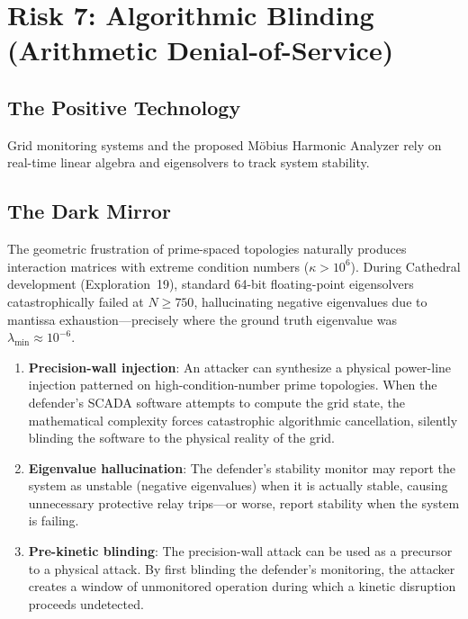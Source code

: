 \documentclass[11pt,a4paper]{article}
\begin{document}
\section{Risk 7: Algorithmic Blinding (Arithmetic Denial-of-Service)}
\label{sec:blinding}

\subsection{The Positive Technology}

Grid monitoring systems and the proposed M\"obius Harmonic Analyzer
rely on real-time linear algebra and eigensolvers to track system
stability.

\subsection{The Dark Mirror}

The geometric frustration of prime-spaced topologies naturally
produces interaction matrices with extreme condition numbers
($\kappa > 10^6$). During Cathedral development (Exploration~19),
standard 64-bit floating-point eigensolvers catastrophically failed
at $N \geq 750$, hallucinating negative eigenvalues due to mantissa
exhaustion---precisely where the ground truth eigenvalue was
$\lambda_{\min} \approx 10^{-6}$.

\begin{enumerate}
  \item \textbf{Precision-wall injection}: An attacker can synthesize
    a physical power-line injection patterned on high-condition-number
    prime topologies. When the defender's SCADA software attempts to
    compute the grid state, the mathematical complexity forces
    catastrophic algorithmic cancellation, silently blinding the
    software to the physical reality of the grid.

  \item \textbf{Eigenvalue hallucination}: The defender's stability
    monitor may report the system as unstable (negative eigenvalues)
    when it is actually stable, causing unnecessary protective relay
    trips---or worse, report stability when the system is failing.

  \item \textbf{Pre-kinetic blinding}: The precision-wall attack can
    be used as a precursor to a physical attack. By first blinding
    the defender's monitoring, the attacker creates a window of
    unmonitored operation during which a kinetic disruption proceeds
    undetected.
\end{enumerate}
\end{document}
